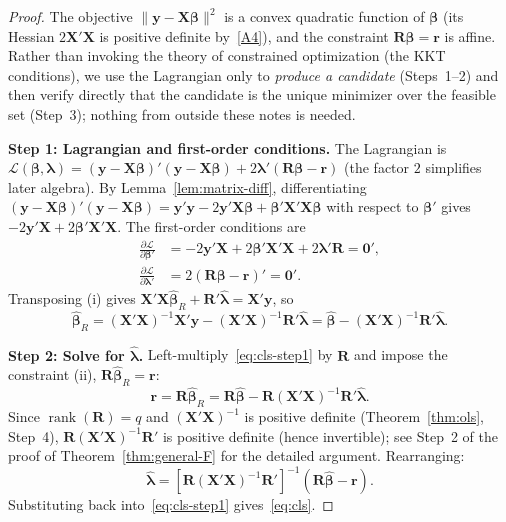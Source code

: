 \documentclass[14pt]{extarticle}
\theoremstyle{plain}
\theoremstyle{definition}
\theoremstyle{remark}
\DeclareMathOperator\rank{rank}
\newcommand{\bX}{\mathbf{X}}
\newcommand{\by}{\mathbf{y}}
\def\bb{\boldsymbol{\beta}}
\newcommand{\bR}{\mathbf{R}}
\newcommand{\br}{\mathbf{r}}
\newcommand{\bzero}{\mathbf{0}}
\begin{document}
\begin{proof}
The objective $\|\by - \bX\bb\|^2$ is a convex quadratic function of $\bb$ (its Hessian $2\bX'\bX$ is positive definite by~\ref{A4}), and the constraint $\bR\bb = \br$ is affine. Rather than invoking the theory of constrained optimization (the KKT conditions), we use the Lagrangian only to \emph{produce a candidate} (Steps~1--2) and then verify directly that the candidate is the unique minimizer over the feasible set (Step~3); nothing from outside these notes is needed.

\textbf{Step 1: Lagrangian and first-order conditions.} The Lagrangian is $\mathcal{L}(\bb, \boldsymbol\lambda) = (\by - \bX\bb)'(\by - \bX\bb) + 2\boldsymbol\lambda'(\bR\bb - \br)$ (the factor $2$ simplifies later algebra). By Lemma~\ref{lem:matrix-diff}, differentiating $(\by - \bX\bb)'(\by - \bX\bb) = \by'\by - 2\by'\bX\bb + \bb'\bX'\bX\bb$ with respect to $\bb'$ gives $-2\by'\bX + 2\bb'\bX'\bX$. The first-order conditions are
\begin{align*}
\frac{\partial \mathcal{L}}{\partial \bb'} &= -2\by'\bX + 2\bb'\bX'\bX + 2\boldsymbol\lambda'\bR = \bzero', \tag{i}\\
\frac{\partial \mathcal{L}}{\partial \boldsymbol\lambda'} &= 2(\bR\bb - \br)' = \bzero'. \tag{ii}
\end{align*}
Transposing (i) gives $\bX'\bX\hat{\bb}_R + \bR'\hat{\boldsymbol\lambda} = \bX'\by$, so
\begin{equation}\label{eq:cls-step1}
\hat{\bb}_R = (\bX'\bX)^{-1}\bX'\by - (\bX'\bX)^{-1}\bR'\hat{\boldsymbol\lambda} = \hat{\bb} - (\bX'\bX)^{-1}\bR'\hat{\boldsymbol\lambda}.
\end{equation}

\textbf{Step 2: Solve for $\hat{\boldsymbol\lambda}$.} Left-multiply~\eqref{eq:cls-step1} by $\bR$ and impose the constraint (ii), $\bR\hat{\bb}_R = \br$:
\[
\br = \bR\hat{\bb}_R = \bR\hat{\bb} - \bR(\bX'\bX)^{-1}\bR'\hat{\boldsymbol\lambda}.
\]
Since $\rank(\bR) = q$ and $(\bX'\bX)^{-1}$ is positive definite (Theorem~\ref{thm:ols}, Step~4), $\bR(\bX'\bX)^{-1}\bR'$ is positive definite (hence invertible); see Step~2 of the proof of Theorem~\ref{thm:general-F} for the detailed argument. Rearranging:
\[
\hat{\boldsymbol\lambda} = [\bR(\bX'\bX)^{-1}\bR']^{-1}(\bR\hat{\bb} - \br).
\]
Substituting back into~\eqref{eq:cls-step1} gives~\eqref{eq:cls}.


\end{proof}
\end{document}
